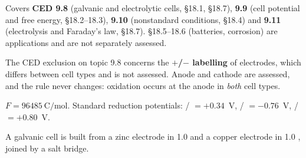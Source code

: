 \documentclass{apchem-exam}
\begin{document}
\apctitleblock

\begin{apcnote}[Scope]
Covers \textbf{CED 9.8} (galvanic and electrolytic cells, \S18.1,
\S18.7), \textbf{9.9} (cell potential and free energy,
\S18.2--18.3), \textbf{9.10} (nonstandard conditions, \S18.4) and
\textbf{9.11} (electrolysis and Faraday's law, \S18.7). \S18.5--18.6
(batteries, corrosion) are applications and are not separately assessed.

The CED exclusion on topic 9.8 concerns the \textbf{$+$/$-$ labelling}
of electrodes, which differs between cell types and is not assessed.
Anode and cathode are assessed, and the rule never changes: oxidation
occurs at the anode in \emph{both} cell types.

$F = \SI{96485}{\coulomb\per\mole}$. Standard reduction potentials:
/ $= +0.34$~V, / $= -0.76$~V,
/ $= +0.80$~V.
\end{apcnote}



A galvanic cell is built from a zinc electrode in
\SI{1.0}{\Molar}  and a copper electrode in
\SI{1.0}{\Molar} , joined by a salt bridge.
\end{document}
